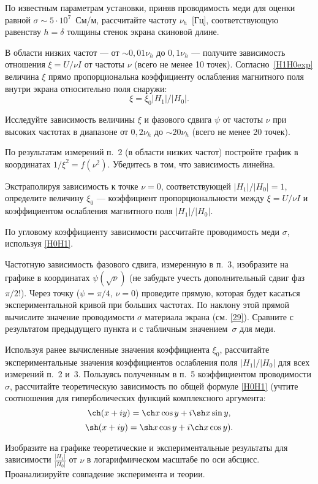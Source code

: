 \begin{lab:task}
\item По известным параметрам установки, приняв проводимость меди
для оценки равной $\sigma \sim 5\cdot 10^{7}$~См/м, рассчитайте частоту
$\nu_h$~[Гц], соответствующую равенству $h=\delta$ толщины стенок экрана
скиновой длине.

\item В области низких частот --- от  $\sim 0,01\nu_h$ до $0,1\nu_{h}$ --- 
получите зависимость отношения $\xi = U/\nu I$ от
частоты $\nu$ (всего не менее 10 точек). Согласно~\eqref{H1H0exp} величина $\xi$ прямо
пропорциональна коэффициенту ослабления магнитного поля внутри
экрана относительно поля снаружи:
\[\xi=\xi_0 |H_1|/|H_0|.\]

\item Исследуйте зависимость величины $\xi$
и фазового сдвига $\psi$ от частоты $\nu$ при высоких частотах
в диапазоне от $0,2\nu_h$ до $\sim 20\nu_h$
(всего не менее 20 точек).


\item По результатам измерений п.~2 (в области низких частот)
постройте график в координатах $1/\xi^2=f(\nu^2)$.
Убедитесь в том, что зависимость линейна.

Экстраполируя зависимость к точке $\nu=0$, соответствующей
$|H_1|/|H_0|=1$, определите величину $\xi_0$ --- коэффициент
пропорциональности между $\xi=U/\nu I$ и коэффициентом ослабления магнитного поля
$|H_1|/|H_0|$.

По угловому коэффициенту зависимости рассчитайте проводимость меди $\sigma$,
используя \eqref{H0H1}.

\item Частотную зависимость фазового сдвига,
измеренную в п.~3, изобразите на графике в координатах
$\psi(\sqrt{\nu})$ (не забудьте учесть дополнительный сдвиг фаз $\pi/2$!).
Через точку ($\psi=\pi/4$, $\nu=0$) проведите прямую,
которая будет касаться экспериментальной кривой при больших частотах.
По наклону этой прямой вычислите значение проводимости $\sigma$ материала экрана
(см. \eqref{29}).
Сравните с результатом предыдущего пункта и с табличным значением~$\sigma$ для меди.

\item Используя ранее вычисленные значения коэффициента $\xi_0$,
рассчитайте экспериментальные значения коэффициентов
ослабления поля $|H_1|/|H_0|$ для всех измерений п.~2 и~3.
Пользуясь полученным в п.~5 коэффициентом проводимости $\sigma$,
рассчитайте теоретическую зависимость по общей формуле \eqref{H0H1}
(учтите соотношения для гиперболических функций комплексного аргумента:
\[\ch(x+iy) = \ch x \cos y + i \sh x \sin y,
\]
\[\sh(x+iy) = \sh x \cos y + i \ch x \cos y).
\]

Изобразите на графике теоретические и экспериментальные
результаты для зависимости $\frac{|H_1|}{|H_0|}$ от $\nu$
в логарифмическом масштабе по оси абсцисс.
Проанализируйте совпадение эксперимента и теории.


\end{lab:task}


